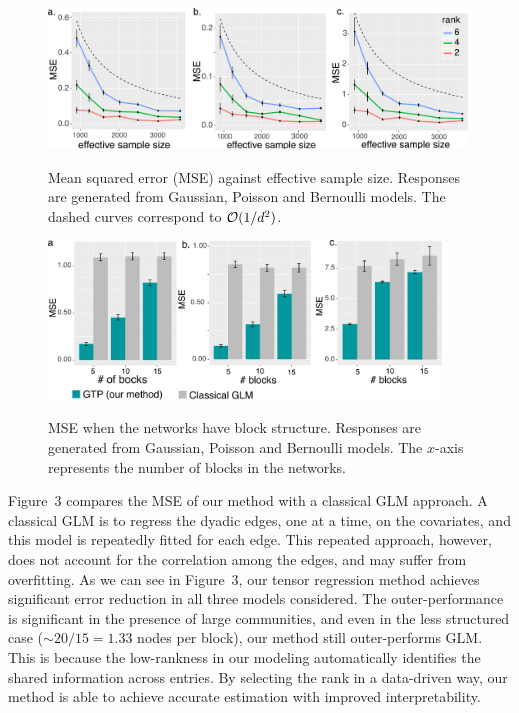 \documentclass{article}
\theoremstyle{plain}
\theoremstyle{definition}
\begin{document}
\begin{figure}[ht]
\begin{minipage}[b]{0.47\textwidth}

    \centering
    \includegraphics[width=0.99\textwidth]{dimension.pdf}\label{fig:dim}
    \caption{\small{Mean squared error (MSE) against effective sample size. Responses are generated from Gaussian, Poisson and Bernoulli models. The dashed curves correspond to $\mathcal{O}({1/d^2})$.} }

\end{minipage}
\hspace{.5cm}
\begin{minipage}[b]{0.47\textwidth}

   \centering
    \includegraphics[width=0.93\textwidth]{comparison.pdf}\label{fig:glm}
    \vspace{-.2cm}
    \caption{\small{MSE when the networks have block structure. Responses are generated from Gaussian, Poisson and Bernoulli models. The $x$-axis represents the number of blocks in the networks.} }

\end{minipage}
\end{figure}

Figure~3 compares the MSE of our method with a classical GLM approach. A classical GLM is to regress the dyadic edges, one at a time, on the covariates, and this model is repeatedly fitted for each edge. This repeated approach, however, does not account for the correlation among the edges, and may suffer from overfitting. As we can see in Figure~3, our tensor regression method achieves significant error reduction in all three models considered. The outer-performance is significant in the presence of large communities, and even in the less structured case ($\sim 20/15=1.33$ nodes per block), our method still outer-performs GLM. This is because the low-rankness in our modeling automatically identifies the shared information across entries. By selecting the rank in a data-driven way, our method is able to achieve accurate estimation with improved interpretability. 
\end{document}
